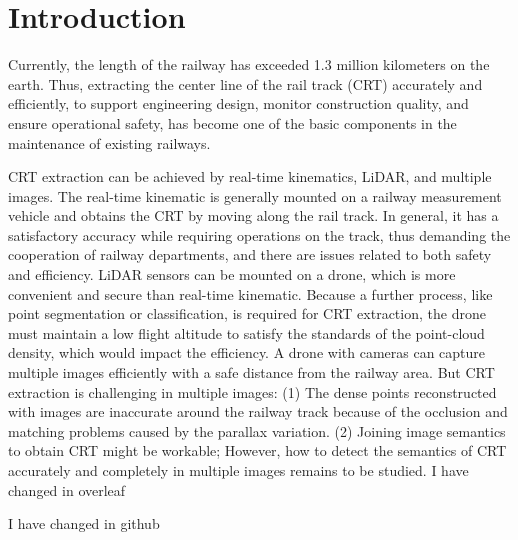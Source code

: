 \section{Introduction}

Currently,
the length of the railway has exceeded 1.3 million kilometers on the earth.
Thus,
extracting the center line of the rail track (CRT) accurately and efficiently, 
to support engineering design, monitor construction quality, 
and ensure operational safety,
has become one of the basic components in the maintenance of existing railways.

CRT extraction can be achieved by real-time kinematics, LiDAR,
and multiple images.
The real-time kinematic is generally mounted on a railway measurement vehicle and obtains the CRT by moving along the rail track.
In general, 
it has a satisfactory accuracy while requiring operations on the track,
thus demanding the cooperation of railway departments, 
and there are issues related to both safety and efficiency.
LiDAR sensors can be mounted on a drone, 
which is more convenient and secure than real-time kinematic. 
Because a further process, 
like point segmentation or classification,
is required for CRT extraction,
the drone must maintain a low flight altitude to satisfy the standards of the point-cloud density,
which would impact the efficiency.
A drone with cameras can capture multiple images efficiently with a safe distance from the railway area.
But CRT extraction is challenging in multiple images:
(1) The dense points reconstructed with images are inaccurate around the railway track because of the occlusion and matching problems caused by the parallax variation.
(2) Joining image semantics to obtain CRT might be workable;
However,
how to detect the semantics of CRT accurately and completely in multiple images remains to be studied.
I have changed in overleaf

I have changed in github











